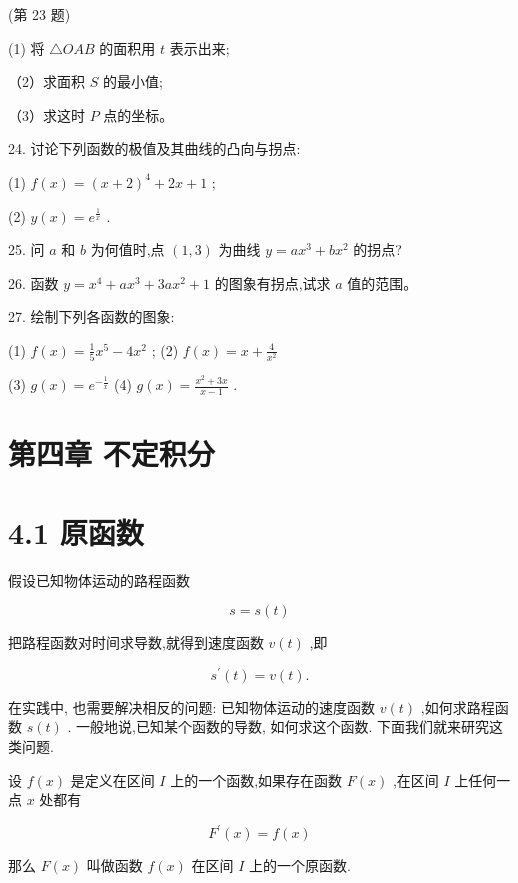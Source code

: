 \documentclass[10pt]{article}
\begin{document}
(第 23 题)

(1) 将 \(\bigtriangleup {OAB}\) 的面积用 \(t\) 表示出来;

（2）求面积 \(S\) 的最小值;

（3）求这时 \(P\) 点的坐标。

24. 讨论下列函数的极值及其曲线的凸向与拐点:

(1) \(f\left( x\right) = {\left( x + 2\right) }^{4} + {2x} + 1\) ;

(2) \(y\left( x\right) = {e}^{\frac{1}{x}}\) .

25. 问 \(a\) 和 \(b\) 为何值时,点 \(\left( {1,3}\right)\) 为曲线 \(y = a{x}^{3} + b{x}^{2}\) 的拐点?

26. 函数 \(y = {x}^{4} + a{x}^{3} + {3a}{x}^{2} + 1\) 的图象有拐点,试求 \(a\) 值的范围。

27. 绘制下列各函数的图象:

(1) \(f\left( x\right) = \frac{1}{5}{x}^{5} - 4{x}^{2}\) ; (2) \(f\left( x\right) = x + \frac{4}{{x}^{2}}\)

(3) \(g\left( x\right) = {e}^{-\frac{1}{x}}\) (4) \(g\left( x\right) = \frac{{x}^{2} + {3x}}{x - 1}\) .

\section*{第四章 不定积分}

\section*{4.1 原函数}

假设已知物体运动的路程函数

\[
s = s\left( t\right)
\]

把路程函数对时间求导数,就得到速度函数 \(v\left( t\right)\) ,即

\[
{s}^{\prime }\left( t\right) = v\left( t\right) \text{.}
\]

在实践中, 也需要解决相反的问题: 已知物体运动的速度函数 \(v\left( t\right)\) ,如何求路程函数 \(s\left( t\right)\) . 一般地说,已知某个函数的导数, 如何求这个函数. 下面我们就来研究这类问题.

设 \(f\left( x\right)\) 是定义在区间 \(I\) 上的一个函数,如果存在函数 \(F\left( x\right)\) ,在区间 \(I\) 上任何一点 \(x\) 处都有

\[
{F}^{\prime }\left( x\right) = f\left( x\right)
\]

那么 \(F\left( x\right)\) 叫做函数 \(f\left( x\right)\) 在区间 \(I\) 上的一个原函数.
\end{document}
